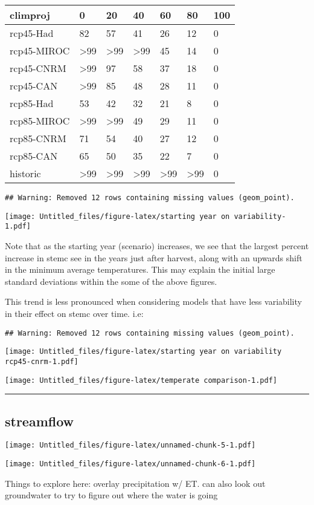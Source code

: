 \documentclass[]{article}
\begin{document}
\begin{table}[H]
\centering
\begin{tabular}{l|l|l|l|l|l|l}
\hline
climproj & 0 & 20 & 40 & 60 & 80 & 100\\
\hline
rcp45-Had & 82 & 57 & 41 & 26 & 12 & 0\\
\hline
rcp45-MIROC & >99 & >99 & >99 & 45 & 14 & 0\\
\hline
rcp45-CNRM & >99 & 97 & 58 & 37 & 18 & 0\\
\hline
rcp45-CAN & >99 & 85 & 48 & 28 & 11 & 0\\
\hline
rcp85-Had & 53 & 42 & 32 & 21 & 8 & 0\\
\hline
rcp85-MIROC & >99 & >99 & 49 & 29 & 11 & 0\\
\hline
rcp85-CNRM & 71 & 54 & 40 & 27 & 12 & 0\\
\hline
rcp85-CAN & 65 & 50 & 35 & 22 & 7 & 0\\
\hline
historic & >99 & >99 & >99 & >99 & >99 & 0\\
\hline
\end{tabular}
\end{table}

\begin{verbatim}
## Warning: Removed 12 rows containing missing values (geom_point).
\end{verbatim}

\texttt{[image: Untitled\_files/figure-latex/starting year on variability-1.pdf]}

Note that as the starting year (scenario) increases, we see that the
largest percent increase in stemc see in the years just after harvest,
along with an upwards shift in the minimum average temperatures. This
may explain the initial large standard deviations within the some of the
above figures.

This trend is less pronounced when considering models that have less
variability in their effect on stemc over time. i.e:

\begin{verbatim}
## Warning: Removed 12 rows containing missing values (geom_point).
\end{verbatim}

\texttt{[image: Untitled\_files/figure-latex/starting year on variability rcp45-cnrm-1.pdf]}

\texttt{[image: Untitled\_files/figure-latex/temperate comparison-1.pdf]}

\begin{center}\rule{0.5\linewidth}{\linethickness}\end{center}

\subsection{streamflow}\label{streamflow}

\texttt{[image: Untitled\_files/figure-latex/unnamed-chunk-5-1.pdf]}

\texttt{[image: Untitled\_files/figure-latex/unnamed-chunk-6-1.pdf]}

Things to explore here: overlay precipitation w/ ET. can also look out
groundwater to try to figure out where the water is going
\end{document}

